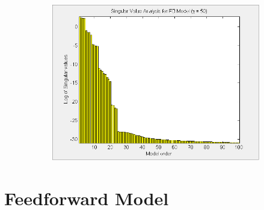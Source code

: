 \begin{landscape}
\begin{figure}[H]
\begin{subfigure}[b]{0.4\textwidth}
\includegraphics[width=1.0\textwidth]{pics/SVD_FB_50}
\caption{}
\label{pic:}
\end{subfigure}
\end{figure}

\section{Feedforward Model}


\end{landscape}
